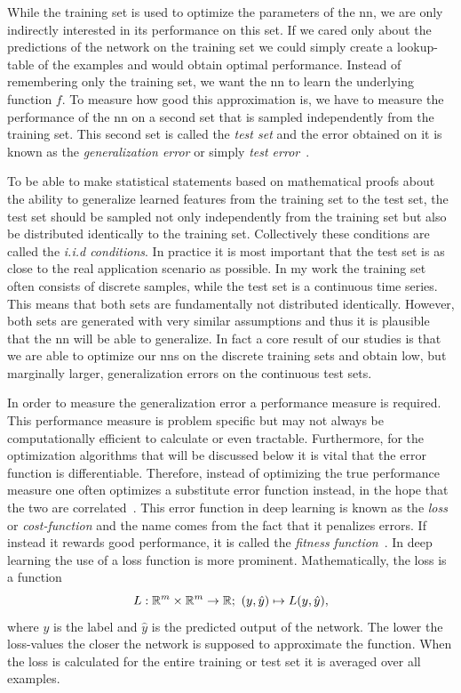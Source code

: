 While the training set is used to optimize the parameters of the \acrshort{nn}, we are only indirectly interested in its performance on this set. If we cared only about the predictions of the network on the training set we could simply create a lookup-table of the examples and would obtain optimal performance. Instead of remembering only the training set, we want the \acrshort{nn} to learn the underlying function $f$. To measure how good this approximation is, we have to measure the performance of the \acrshort{nn} on a second set that is sampled independently from the training set. This second set is called the \emph{test set} and the error obtained on it is known as the \emph{generalization error} or simply \emph{test error}~\cite{Goodfellow:2016:DNN}.

To be able to make statistical statements based on mathematical proofs about the ability to generalize learned features from the training set to the test set, the test set should be sampled not only independently from the training set but also be distributed identically to the training set. Collectively these conditions are called the \emph{i.i.d conditions}. In practice it is most important that the test set is as close to the real application scenario as possible. In my work the training set often consists of discrete samples, while the test set is a continuous time series. This means that both sets are fundamentally not distributed identically. However, both sets are generated with very similar assumptions and thus it is plausible that the \acrshort{nn} will be able to generalize. In fact a core result of our studies is that we are able to optimize our \acrshort{nn}s on the discrete training sets and obtain low, but marginally larger, generalization errors on the continuous test sets.

In order to measure the generalization error a performance measure is required. This performance measure is problem specific but may not always be computationally efficient to calculate or even tractable. Furthermore, for the optimization algorithms that will be discussed below it is vital that the error function is differentiable. Therefore, instead of optimizing the true performance measure one often optimizes a substitute error function instead, in the hope that the two are correlated~\cite{Goodfellow:2016:DNN}. %
This error function in deep learning is known as the \emph{loss} or \emph{cost-function} and the name comes from the fact that it penalizes errors. If instead it rewards good performance, it is called the \emph{fitness function}~\cite{Geron:2017aaa}. %
In deep learning the use of a loss function is more prominent. Mathematically, the loss is a function
\begin{equation}
L: \R^m\times\R^m\to\R;\ \lr{y, \hat{y}}\mapsto L\lr{y, \hat{y}},
\end{equation}
where $y$ is the label and $\hat{y}$ is the predicted output of the network. The lower the loss-values the closer the network is supposed to approximate the function. When the loss is calculated for the entire training or test set it is averaged over all examples.

